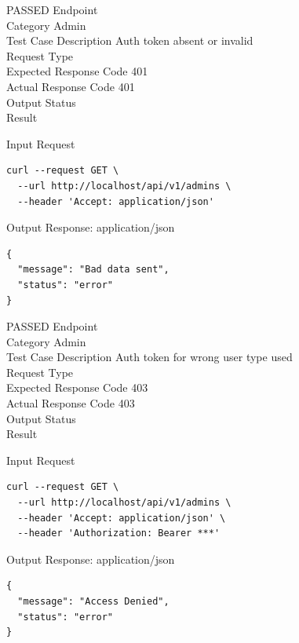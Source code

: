 \begin{testcase}{23}{PASSED}
Endpoint \hfill {}\\
Category \hfill Admin\\
Test Case Description \hfill Auth token absent or invalid\\

Request Type    \hfill {}\\
Expected Response Code    \hfill 401\\
Actual Response Code    \hfill 401\\

Output Status \hfill {}\\
Result \hfill {}

\begin{ipblock}{Input Request}
\begin{verbatim}
curl --request GET \
  --url http://localhost/api/v1/admins \
  --header 'Accept: application/json' 
\end{verbatim}
\end{ipblock}

\begin{opblock}{Output Response: application/json}
\begin{verbatim}
{
  "message": "Bad data sent",
  "status": "error"
}
\end{verbatim}
\end{opblock}
\end{testcase}

\begin{testcase}{24}{PASSED}
Endpoint \hfill {}\\
Category \hfill Admin\\
Test Case Description \hfill Auth token for wrong user type used\\

Request Type    \hfill \eptype{GET}\\
Expected Response Code    \hfill 403\\
Actual Response Code    \hfill 403\\

Output Status \hfill {}\\
Result \hfill {}

\begin{ipblock}{Input Request}
\begin{verbatim}
curl --request GET \
  --url http://localhost/api/v1/admins \
  --header 'Accept: application/json' \
  --header 'Authorization: Bearer ***'
\end{verbatim}
\end{ipblock}

\begin{opblock}{Output Response: application/json}
\begin{verbatim}
{
  "message": "Access Denied",
  "status": "error"
}
\end{verbatim}
\end{opblock}
\end{testcase}


